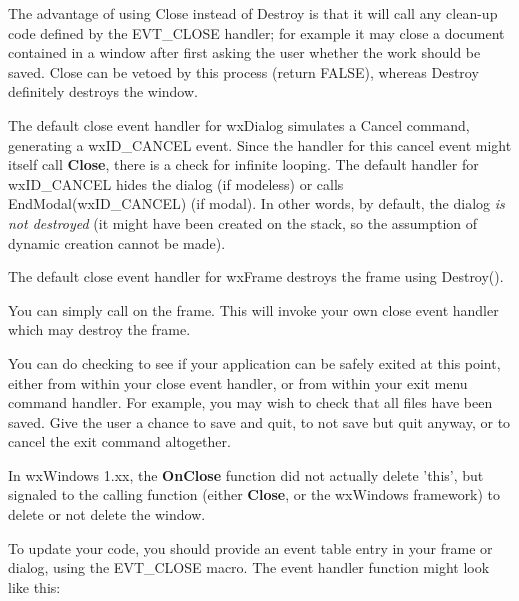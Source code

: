 The advantage of using Close instead of Destroy is that it will call any clean-up code
defined by the EVT\_CLOSE handler; for example it may close a document contained in
a window after first asking the user whether the work should be saved. Close can be vetoed
by this process (return FALSE), whereas Destroy definitely destroys the window.


The default close event handler for wxDialog simulates a Cancel command,
generating a wxID\_CANCEL event. Since the handler for this cancel event might
itself call {\bf Close}, there is a check for infinite looping. The default handler
for wxID\_CANCEL hides the dialog (if modeless) or calls EndModal(wxID\_CANCEL) (if modal).
In other words, by default, the dialog {\it is not destroyed} (it might have been created
on the stack, so the assumption of dynamic creation cannot be made).

The default close event handler for wxFrame destroys the frame using Destroy().
%


You can simply call  on the frame. This
will invoke your own close event handler which may destroy the frame.

You can do checking to see if your application can be safely exited at this point,
either from within your close event handler, or from within your exit menu command
handler. For example, you may wish to check that all files have been saved.
Give the user a chance to save and quit, to not save but quit anyway, or to cancel
the exit command altogether.


In wxWindows 1.xx, the {\bf OnClose} function did not actually delete 'this', but signaled
to the calling function (either {\bf Close}, or the wxWindows framework) to delete
or not delete the window.

To update your code, you should provide an event table entry in your frame or
dialog, using the EVT\_CLOSE macro. The event handler function might look like this:

